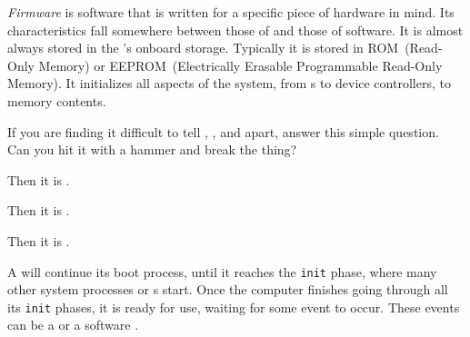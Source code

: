 \begin{definition}[Firmware]\label{def:Firmware}
  \emph{Firmware} is software that is written for a specific piece of hardware in mind.
  Its characteristics fall somewhere between those of  and those of software.
  It is almost always stored in the 's onboard storage.
  Typically it is stored in ROM~(Read-Only Memory) or EEPROM~(Electrically Erasable Programmable Read-Only Memory).
  It initializes all aspects of the system, from  s to device controllers, to memory contents.

  \begin{remark}\label{rmk:Firmware_Differentiate}
    If you are finding it difficult to tell , , and  apart, answer this simple question.
    Can you hit it with a hammer and break the thing?
    \begin{description}[noitemsep]
    \item[Yes] Then it is .
    \item[No] Then it is .
    \item[Yes and No] Then it is .
    \end{description}
  \end{remark}
\end{definition}

A  will continue its boot process, until it reaches the \texttt{init} phase, where many other system processes or s start.
Once the computer finishes going through all its \texttt{init} phases, it is ready for use, waiting for some event to occur.
These events can be a   or a software .

